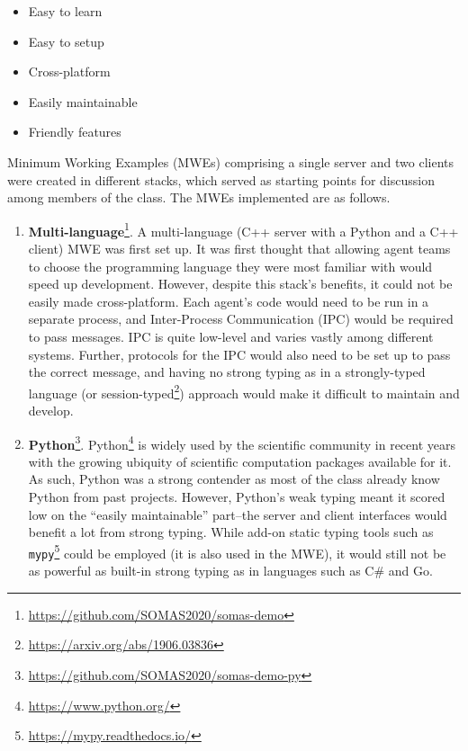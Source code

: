 \begin{itemize}
    \item Easy to learn
    \item Easy to setup
    \item Cross-platform
    \item Easily maintainable
    \item Friendly features
\end{itemize}

Minimum Working Examples (MWEs) comprising a single server and two clients were created in different stacks, which served as starting points for discussion among members of the class. The MWEs implemented are as follows.

\begin{enumerate}
    \item \textbf{Multi-language}\footnote{\url{https://github.com/SOMAS2020/somas-demo}}.
          A multi-language (C++ server with a Python and a C++ client) MWE was first set up. It was first thought that allowing agent teams to choose the programming language they were most familiar with would speed up development. However, despite this stack's benefits, it could not be easily made cross-platform. Each agent's code would need to be run in a separate process, and Inter-Process Communication (IPC) would be required to pass messages. IPC is quite low-level and varies vastly among different systems. Further, protocols for the IPC would also need to be set up to pass the correct message, and having no strong typing as in a strongly-typed language (or session-typed\footnote{\url{https://arxiv.org/abs/1906.03836}}) approach would make it difficult to maintain and develop.

    \item \textbf{Python}\footnote{\url{https://github.com/SOMAS2020/somas-demo-py}}.
          Python\footnote{\url{https://www.python.org/}} is widely used by the scientific community in recent years with the growing ubiquity of scientific computation packages available for it. As such, Python was a strong contender as most of the class already know Python from past projects. However, Python's weak typing meant it scored low on the ``easily maintainable'' part--the server and client interfaces would benefit a lot from strong typing. While add-on static typing tools such as \texttt{mypy}\footnote{\url{https://mypy.readthedocs.io/}} could be employed (it is also used in the MWE), it would still not be as powerful as built-in strong typing as in languages such as C\# and Go.


\end{enumerate}
